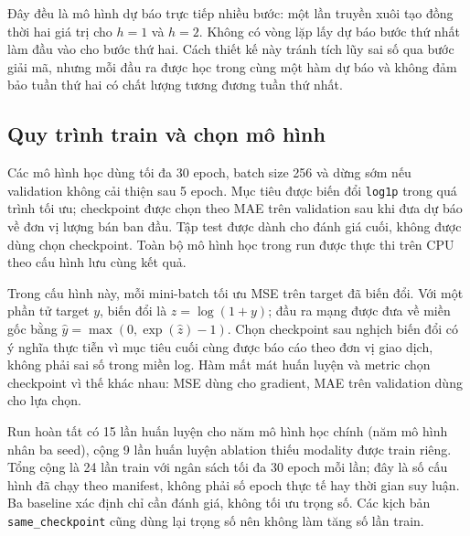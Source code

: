\documentclass[12pt,a4paper,oneside]{article}
\begin{document}
Đây đều là mô hình dự báo trực tiếp nhiều bước: một lần truyền xuôi tạo đồng thời hai giá trị cho $h=1$ và $h=2$. Không có vòng lặp lấy dự báo bước thứ nhất làm đầu vào cho bước thứ hai. Cách thiết kế này tránh tích lũy sai số qua bước giải mã, nhưng mỗi đầu ra được học trong cùng một hàm dự báo và không đảm bảo tuần thứ hai có chất lượng tương đương tuần thứ nhất.

\subsection{Quy trình train và chọn mô hình}
Các mô hình học dùng tối đa 30 epoch, batch size 256 và dừng sớm nếu validation không cải thiện sau 5 epoch. Mục tiêu được biến đổi \texttt{log1p} trong quá trình tối ưu; checkpoint được chọn theo MAE trên validation sau khi đưa dự báo về đơn vị lượng bán ban đầu. Tập test được dành cho đánh giá cuối, không được dùng chọn checkpoint. Toàn bộ mô hình học trong run được thực thi trên CPU theo cấu hình lưu cùng kết quả.

Trong cấu hình này, mỗi mini-batch tối ưu MSE trên target đã biến đổi. Với một phần tử target $y$, biến đổi là $z=\log(1+y)$; đầu ra mạng được đưa về miền gốc bằng $\hat y=\max(0,\exp(\hat z)-1)$. Chọn checkpoint sau nghịch biến đổi có ý nghĩa thực tiễn vì mục tiêu cuối cùng được báo cáo theo đơn vị giao dịch, không phải sai số trong miền log. Hàm mất mát huấn luyện và metric chọn checkpoint vì thế khác nhau: MSE dùng cho gradient, MAE trên validation dùng cho lựa chọn.

Run hoàn tất có 15 lần huấn luyện cho năm mô hình học chính (năm mô hình nhân ba seed), cộng 9 lần huấn luyện ablation thiếu modality được train riêng. Tổng cộng là 24 lần train với ngân sách tối đa 30 epoch mỗi lần; đây là số cấu hình đã chạy theo manifest, không phải số epoch thực tế hay thời gian suy luận. Ba baseline xác định chỉ cần đánh giá, không tối ưu trọng số. Các kịch bản \texttt{same\_checkpoint} cũng dùng lại trọng số nên không làm tăng số lần train.
\end{document}
